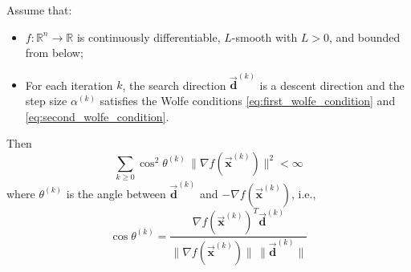 \documentclass[9pt, headings=standardclasses, parskip=half]{scrartcl}
\newcommand{\vect}[1]{\vec{\boldsymbol{#1}}}
\begin{document}
\begin{theorem}\label{thm:zoutendijk}
Assume that:
\begin{itemize}
  \item \(f:\mathbb{R}^{n}\to\mathbb{R}\) is continuously differentiable, \(L\)-smooth with \(L>0\), and bounded from below;
  \item For each iteration \(k\), the search direction \(\vect{d}^{(k)}\) is a descent direction and the step size \(\alpha^{(k)}\) satisfies the Wolfe conditions \eqref{eq:first_wolfe_condition} and \eqref{eq:second_wolfe_condition}.
\end{itemize}
Then
\[
\sum_{k \geq 0} \cos^2\theta^{(k)}\, \|\nabla f(\vect{x}^{(k)})\|^2 < \infty %
\]
where \(\theta^{(k)}\) is the angle between \(\vect{d}^{(k)}\) and \(-\nabla f(\vect{x}^{(k)})\), i.e.,
\[
\cos\theta^{(k)} = \frac{\nabla f(\vect{x}^{(k)})^T \vect{d}^{(k)}}{\|\nabla f(\vect{x}^{(k)})\|\,\|\vect{d}^{(k)}\|} %
\]
\end{theorem}
\end{document}
